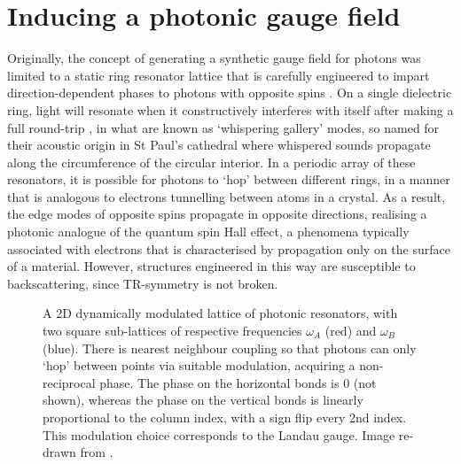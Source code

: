 \section{Inducing a photonic gauge field}

\label{sec:inducing}
Originally, the concept of generating a synthetic gauge field for photons was limited to a static ring resonator lattice that is carefully engineered to impart direction-dependent phases to photons with opposite spins \cite{Umucallar2011a}. On a single dielectric ring, light will resonate when it constructively interferes with itself after making a full round-trip \cite{Bogaerts2012}, in what are known as `whispering gallery' modes, so named for their acoustic origin in St Paul's cathedral where whispered sounds propagate along the circumference of the circular interior. In a periodic array of these resonators, it is possible for photons to `hop' between different rings, in a manner that is analogous to electrons tunnelling between atoms in a crystal. As a result, the edge modes of opposite spins propagate in opposite directions, realising a photonic analogue of the quantum spin Hall effect, a phenomena typically associated with electrons that is characterised by propagation only on the surface of a material. However, structures engineered in this way are susceptible to backscattering, since TR-symmetry is not broken. 


\begin{figure}[t]
	\centering
	\def\svgwidth{0.5\textwidth}
	\begin{normalsize}
		
	\end{normalsize}
	\caption[A 2D dynamically modulated lattice of photonic resonators]{A 2D dynamically modulated lattice of photonic resonators, with two square sub-lattices of respective frequencies $\omega_A$ (red) and $\omega_B$ (blue). There is nearest neighbour coupling so that photons can only ‘hop’ between points via suitable modulation, acquiring a non-reciprocal phase. The phase on the horizontal bonds is $0$ (not shown), whereas the phase on the vertical bonds is linearly proportional to the column index, with a sign flip every 2nd index. This modulation choice corresponds to the Landau gauge. Image re-drawn from \cite{Fang2012}.}
	\label{fig:dynamiclattice}
\end{figure}
 
